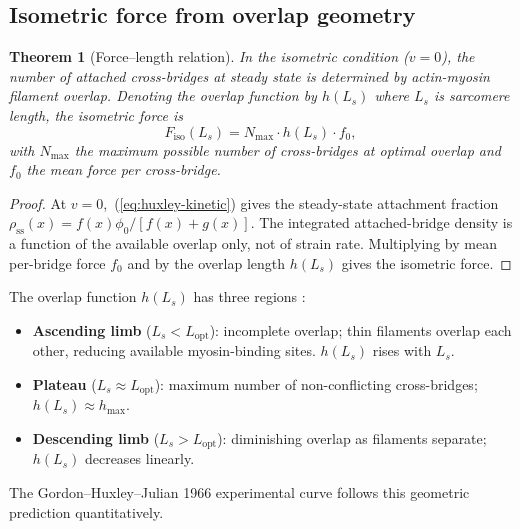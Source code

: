 \documentclass[11pt,twocolumn,a4paper]{article}
\newtheorem{theorem}{Theorem}[section]
\theoremstyle{definition}
\theoremstyle{remark}
\begin{document}
\subsection{Isometric force from overlap geometry}

\begin{theorem}[Force--length relation]
\label{thm:force-length}
In the isometric condition ($v = 0$), the number of attached
cross-bridges at steady state is determined by actin-myosin filament
overlap. Denoting the overlap function by $h(L_s)$ where $L_s$ is
sarcomere length, the isometric force is
\begin{equation}
F_{\mathrm{iso}}(L_s) = N_{\mathrm{max}} \cdot h(L_s) \cdot f_0,
\label{eq:force-length}
\end{equation}
with $N_{\mathrm{max}}$ the maximum possible number of cross-bridges
at optimal overlap and $f_0$ the mean force per cross-bridge.
\end{theorem}

\begin{proof}
At $v = 0$,~(\ref{eq:huxley-kinetic}) gives the steady-state
attachment fraction $\rho_{\mathrm{ss}}(x) = f(x) \phi_0 /
[f(x) + g(x)]$. The integrated attached-bridge density is a function
of the available overlap only, not of strain rate. Multiplying by
mean per-bridge force $f_0$ and by the overlap length $h(L_s)$ gives
the isometric force.
\end{proof}

The overlap function $h(L_s)$ has three regions
\citep{gordon1966}:
\begin{itemize}[leftmargin=*,itemsep=2pt]
\item \textbf{Ascending limb} ($L_s < L_{\mathrm{opt}}$): incomplete
overlap; thin filaments overlap each other, reducing available
myosin-binding sites. $h(L_s)$ rises with $L_s$.
\item \textbf{Plateau} ($L_s \approx L_{\mathrm{opt}}$): maximum
number of non-conflicting cross-bridges; $h(L_s) \approx
h_{\mathrm{max}}$.
\item \textbf{Descending limb} ($L_s > L_{\mathrm{opt}}$):
diminishing overlap as filaments separate; $h(L_s)$ decreases
linearly.
\end{itemize}
The Gordon--Huxley--Julian 1966 experimental curve follows this
geometric prediction quantitatively.
\end{document}
